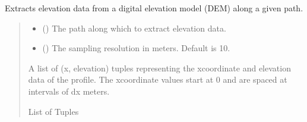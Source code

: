 \documentclass[letterpaper,10pt,english]{sphinxmanual}
\begin{document}
\begin{fulllineitems}
\begin{fulllineitems}
\label{\detokenize{pysewer:id12}}
\pysigstartsignatures
{}
\pysigstopsignatures
\sphinxAtStartPar
Extracts elevation data from a digital elevation model (DEM) along a given path.
\begin{quote}\begin{description}
\begin{itemize}
\item {} 
\sphinxAtStartPar
{} () \textendash{} The path along which to extract elevation data.

\item {} 
\sphinxAtStartPar
{} (\sphinxstyleliteralemphasis{\sphinxupquote{, }}) \textendash{} The sampling resolution in meters. Default is 10.

\end{itemize}

\sphinxAtStartPar
A list of (x, elevation) tuples representing the x\sphinxhyphen{}coordinate and elevation data of the profile.
The x\sphinxhyphen{}coordinate values start at 0 and are spaced at intervals of dx meters.

\sphinxAtStartPar
List of Tuples

\end{description}\end{quote}

\end{fulllineitems}


\begin{fulllineitems}
\label{\detokenize{pysewer:id13}}
\pysigstartsignatures
{}
\pysigstopsignatures
\end{fulllineitems}


\end{fulllineitems}
\end{document}
